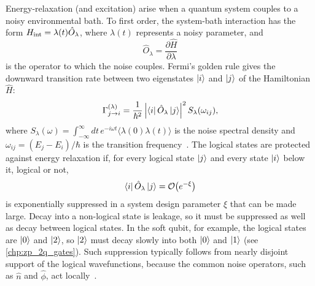 Energy-relaxation (and excitation) arise when a quantum system couples to a noisy environmental bath.
To first order, the system-bath interaction has the form $H_{\rm int} =\lambda(t)\hat O_\lambda$, where $\lambda (t)$ represents a noisy parameter, and
\begin{equation}
	\hat O_\lambda
	=
	\frac{\partial \hat H}{\partial\lambda}
\end{equation}
is the operator to which the noise couples.
Fermi's golden rule gives the downward transition rate between two eigenstates $\ket{i}$ and $\ket{j}$ of the Hamiltonian $\hat H$:
\begin{equation}
	\Gamma_{j \rightarrow i}^{(\lambda)}
	=
	\frac{1}{\hbar^2}
	\left|
		\bra{i} \hat O_\lambda \ket{j}
	\right|^2
	S_\lambda(\omega_{ij}),
	\label{eq:fermi-golden-rule-relaxation}
\end{equation}
where $S_\lambda(\omega)=\int_{-\infty}^{\infty}dt\,e^{-i\omega t}\langle\lambda(0)\lambda(t)\rangle$ is the noise spectral density and $\omega_{ij}=(E_j-E_i)/\hbar$ is the transition frequency~\cite{groszkowski2018}.
The logical states are protected against energy relaxation if, for every logical state $\ket{j}$ and every state $\ket{i}$ below it, logical or not,
\begin{align}
    \bra{i} \hat O_\lambda \ket{j} = \mathcal O\big(e^{-\xi}\big)
\end{align}
is exponentially suppressed in a system design parameter $\xi$ that can be made large.
Decay into a non-logical state is leakage, so it must be suppressed as well as decay between logical states.
In the soft \zps qubit, for example, the logical states are $\ket{0}$ and $\ket{2}$, so $\ket{2}$ must decay slowly into both $\ket{0}$ and $\ket{1}$  (see \cref{chp:zp_2q_gates}).
Such suppression typically follows from nearly disjoint support of the logical wavefunctions, because the common noise operators, such as $\hat n$ and $\hat\phi$, act locally~\cite{gyenisMovingTransmonNoiseProtected2021b}.

